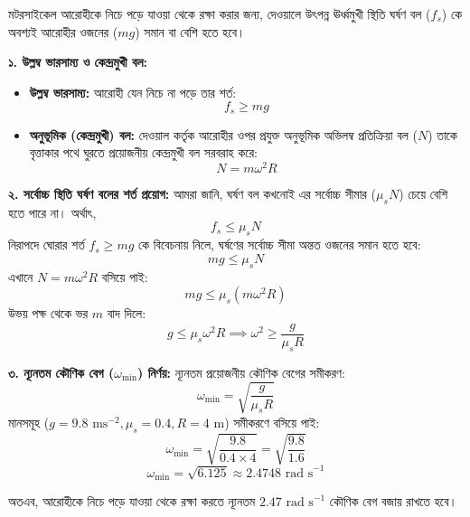 \documentclass[12pt, a4paper]{article}
\begin{document}
\begin{tcolorbox}[solutionbox={সমাধান (Solution)}]
\noindent
মটরসাইকেল আরোহীকে নিচে পড়ে যাওয়া থেকে রক্ষা করার জন্য, দেওয়ালে উৎপন্ন ঊর্ধ্বমুখী স্থিতি ঘর্ষণ বল ($f_s$) কে অবশ্যই আরোহীর ওজনের ($mg$) সমান বা বেশি হতে হবে। 

\vspace{0.5em}
\textbf{১. উল্লম্ব ভারসাম্য ও কেন্দ্রমুখী বল:}
\begin{itemize}[leftmargin=1.5em, itemsep=0.2em]
    \item \textbf{উল্লম্ব ভারসাম্য:} আরোহী যেন নিচে না পড়ে তার শর্ত:
    $$f_s \ge mg$$
    \item \textbf{অনুভূমিক (কেন্দ্রমুখী) বল:} দেওয়াল কর্তৃক আরোহীর ওপর প্রযুক্ত অনুভূমিক অভিলম্ব প্রতিক্রিয়া বল ($N$) তাকে বৃত্তাকার পথে ঘুরতে প্রয়োজনীয় কেন্দ্রমুখী বল সরবরাহ করে:
    $$N = m \omega^2 R$$
\end{itemize}

\vspace{0.5em}
\textbf{২. সর্বোচ্চ স্থিতি ঘর্ষণ বলের শর্ত প্রয়োগ:}
আমরা জানি, ঘর্ষণ বল কখনোই এর সর্বোচ্চ সীমার ($\mu_s N$) চেয়ে বেশি হতে পারে না। অর্থাৎ,
$$f_s \le \mu_s N$$
নিরাপদে ঘোরার শর্ত $f_s \ge mg$ কে বিবেচনায় নিলে, ঘর্ষণের সর্বোচ্চ সীমা অন্তত ওজনের সমান হতে হবে:
$$mg \le \mu_s N$$
এখানে $N = m \omega^2 R$ বসিয়ে পাই:
$$mg \le \mu_s (m \omega^2 R)$$
উভয় পক্ষ থেকে ভর $m$ বাদ দিলে:
$$g \le \mu_s \omega^2 R \implies \omega^2 \ge \frac{g}{\mu_s R}$$

\vspace{0.5em}
\textbf{৩. ন্যূনতম কৌণিক বেগ ($\omega_{\min}$) নির্ণয়:}
ন্যূনতম প্রয়োজনীয় কৌণিক বেগের সমীকরণ:
$$\omega_{\min} = \sqrt{\frac{g}{\mu_s R}}$$
মানসমূহ ($g = 9.8\text{ ms}^{-2}, \mu_s = 0.4, R = 4\text{ m}$) সমীকরণে বসিয়ে পাই:
$$\omega_{\min} = \sqrt{\frac{9.8}{0.4 \times 4}} = \sqrt{\frac{9.8}{1.6}}$$
$$\omega_{\min} = \sqrt{6.125} \approx 2.4748\text{ rad s}^{-1}$$

অতএব, আরোহীকে নিচে পড়ে যাওয়া থেকে রক্ষা করতে ন্যূনতম $2.47\text{ rad s}^{-1}$ কৌণিক বেগ বজায় রাখতে হবে।
\end{tcolorbox}
\vspace{1em}
\end{document}
